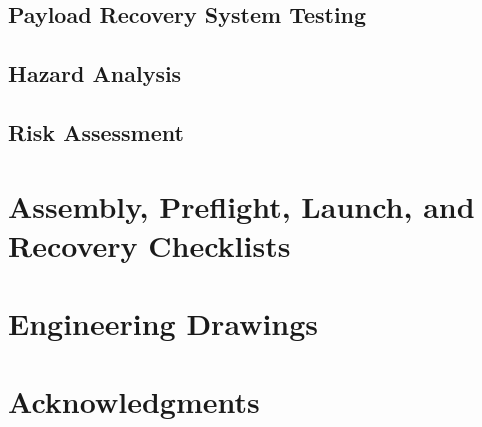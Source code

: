 \documentclass[report, wip]{sac}
\begin{document}
	\subsection{Payload Recovery System Testing}\label{payload-recovery-test}
    \pageleftblank
    
	\begin{landscape}
		\section{Hazard Analysis}\label{hazard}
		\helptext{\HazardAnalysisDescription}

		
	\end{landscape}

    \pagebreak
    
	\begin{landscape}
		\section{Risk Assessment}\label{risk}
		\helptext{\RiskAssessmentDescription}
	\end{landscape}

	\section{Assembly, Preflight, Launch, and Recovery Checklists} \label{checklists}
	\helptext{\ChecklistsDescription}

    \pagebreak
	\section{Engineering Drawings} \label{drawings}
	\helptext{\DrawingsDescription}
    \pageleftblank

    
	\section*{Acknowledgments}
	\helptext{\AcknowledgementsDescription}

	
\end{document}
